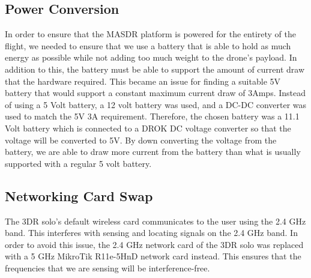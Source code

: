 \subsection{Power Conversion}
In order to ensure that the MASDR platform is powered for the entirety of the flight, we needed to ensure that we use a battery that is able to hold as much energy as possible while not adding too much weight to the drone’s payload. In addition to this, the battery must be able to support the amount of current draw that the hardware required. This became an issue for finding a suitable 5V battery that would support a constant maximum current draw of 3Amps. Instead of using a 5 Volt battery, a 12 volt battery was used, and a DC-DC converter was used to match the 5V 3A requirement. Therefore, the chosen battery was a 11.1 Volt battery which is connected to a DROK DC voltage converter so that the voltage will be converted to 5V. By down converting the voltage from the battery, we are able to draw more current from the battery than what is usually supported with a regular 5 volt battery.
\subsection{Networking Card Swap}
The 3DR solo’s default wireless card communicates to the user using the 2.4 GHz band. This interferes with sensing and locating signals on the 2.4 GHz band. In order to avoid this issue, the 2.4 GHz network card of the 3DR solo was replaced with a 5 GHz MikroTik R11e-5HnD network card instead. This ensures that the frequencies that we are sensing will be interference-free.
